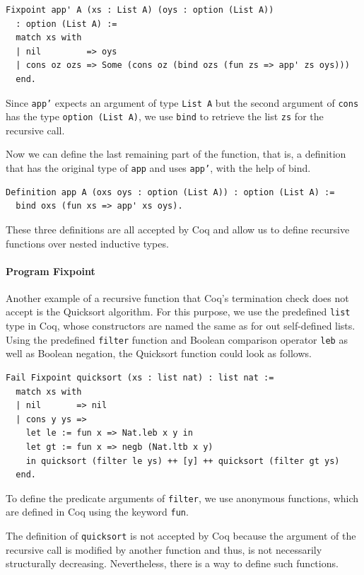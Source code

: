 \documentclass[a4paper, 11pt, fleqn, twoside, abstract=on]{scrreprt}
\newcommand{\cinl}[1]{\texttt{#1}}
\begin{document}
\begin{verbatim}
Fixpoint app' A (xs : List A) (oys : option (List A)) 
  : option (List A) :=
  match xs with
  | nil         => oys
  | cons oz ozs => Some (cons oz (bind ozs (fun zs => app' zs oys)))
  end.
\end{verbatim}
\noindent
Since \cinl{app'} expects an argument of type \cinl{List A} but the second argument of \cinl{cons} has the type \cinl{option (List A)}, we use \cinl{bind} to retrieve the list \cinl{zs} for the recursive call.

Now we can define the last remaining part of the function, that is, a definition that has the original type of \cinl{app} and uses \cinl{app'}, with the help of bind.

\begin{verbatim}
Definition app A (oxs oys : option (List A)) : option (List A) :=
  bind oxs (fun xs => app' xs oys).
\end{verbatim}
\noindent
These three definitions are all accepted by Coq and allow us to define recursive functions over nested inductive types.

\paragraph{Program Fixpoint}
Another example of a recursive function that Coq's termination check does not accept is the Quicksort algorithm.
For this purpose, we use the predefined \cinl{list} type in Coq, whose constructors are named the same as for out self-defined lists.
Using the predefined \cinl{filter} function and Boolean comparison operator \cinl{leb} as well as Boolean negation, the Quicksort function could look as follows.

\begin{verbatim}
Fail Fixpoint quicksort (xs : list nat) : list nat :=
  match xs with
  | nil       => nil
  | cons y ys =>
    let le := fun x => Nat.leb x y in
    let gt := fun x => negb (Nat.ltb x y)
    in quicksort (filter le ys) ++ [y] ++ quicksort (filter gt ys)
  end.
\end{verbatim}
\noindent
To define the predicate arguments of \cinl{filter}, we use anonymous functions, which are defined in Coq using the keyword \cinl{fun}.

The definition of \cinl{quicksort} is not accepted by Coq because the argument of the recursive call is modified by another function and thus, is not necessarily structurally decreasing.
Nevertheless, there is a way to define such functions.
\end{document}
